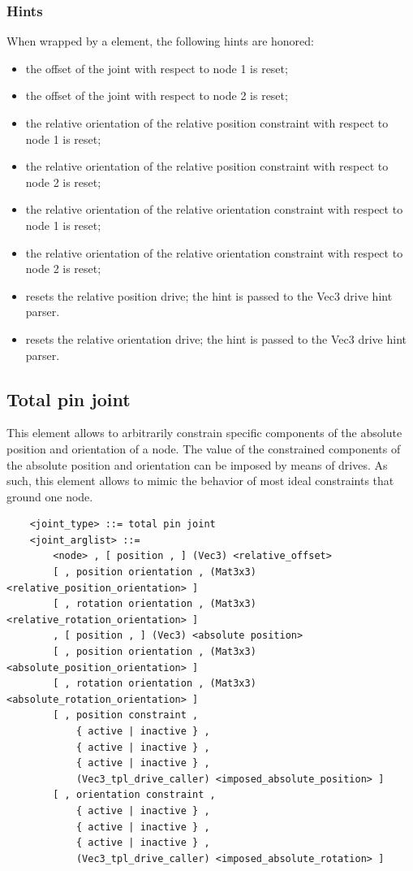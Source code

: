 \subsubsection{Hints}
When wrapped by a  element, the following hints are honored:
\begin{itemize}
\item {} the offset of the joint
with respect to node 1 is reset;
\item {} the offset of the joint
with respect to node 2 is reset;
\item {} the relative orientation
of the relative position constraint with respect to node 1 is reset;
\item {} the relative orientation 
of the relative position constraint with respect to node 2 is reset;
\item {} the relative orientation
of the relative orientation constraint with respect to node 1 is reset;
\item {} the relative orientation 
of the relative orientation constraint with respect to node 2 is reset;
\item {} resets the relative position drive;
the hint is passed to the Vec3 drive hint parser.
\item {} resets the relative orientation drive;
the hint is passed to the Vec3 drive hint parser.
\end{itemize}



\subsection{Total pin joint}
This element allows to arbitrarily constrain specific components
of the absolute position and orientation of a node.
The value of the constrained components of the absolute position
and orientation can be imposed by means of drives.
As such, this element allows to mimic the behavior of most
ideal constraints that ground one node.
\label{sec:EL:STRUCT:JOINT:TOTAL_PIN_JOINT}
\begin{verbatim}
    <joint_type> ::= total pin joint
    <joint_arglist> ::=
        <node> , [ position , ] (Vec3) <relative_offset>
        [ , position orientation , (Mat3x3) <relative_position_orientation> ]
        [ , rotation orientation , (Mat3x3) <relative_rotation_orientation> ]
        , [ position , ] (Vec3) <absolute position>
        [ , position orientation , (Mat3x3) <absolute_position_orientation> ]
        [ , rotation orientation , (Mat3x3) <absolute_rotation_orientation> ]
        [ , position constraint ,
            { active | inactive } ,
            { active | inactive } ,
            { active | inactive } ,
            (Vec3_tpl_drive_caller) <imposed_absolute_position> ]
        [ , orientation constraint ,
            { active | inactive } ,
            { active | inactive } ,
            { active | inactive } ,
            (Vec3_tpl_drive_caller) <imposed_absolute_rotation> ]
\end{verbatim}


